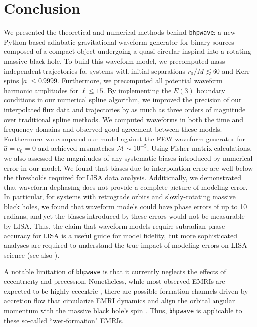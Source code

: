 \documentclass[%
 reprint,
 nofootinbib,
 amsmath,amssymb,
 aps,
 prd,
]{revtex4-2}
\begin{document}
\section{Conclusion}
\label{sec:conclusion}

We presented the theoretical and numerical methods behind \texttt{bhpwave}: a new Python-based adiabatic gravitational waveform generator for binary sources composed of a compact object undergoing a quasi-circular inspiral into a rotating massive black hole. To build this waveform model, we precomputed mass-independent trajectories for systems with initial separations $r_0/M \lesssim 60$ and Kerr spins $|a| \leq 0.9999$. Furthermore, we precomputed all potential waveform harmonic amplitudes for $\ell \leq 15$. By implementing the $E(3)$ boundary conditions in our numerical spline algorithm, we improved the precision of our interpolated flux data and trajectories by as much as three orders of magnitude over traditional spline methods. We computed waveforms in both the time and frequency domains and observed good agreement between these models. Furthermore, we compared our model against the FEW waveform generator for $\hat{a} = e_0 = 0$ and achieved mismatches $\mathcal{M} \sim 10^{-5}$. Using Fisher matrix calculations, we also assessed the magnitudes of any systematic biases introduced by numerical error in our model. We found that biases due to interpolation error are well below the thresholds required for LISA data analysis. Additionally, we demonstrated that waveform dephasing does not provide a complete picture of modeling error. In particular, for systems with retrograde orbits and slowly-rotating massive black holes, we found that waveform models could have phase errors of up to 10 radians, and yet the biases introduced by these errors would not be measurable by LISA. Thus, the claim that waveform models require subradian phase accuracy for LISA is a useful guide for model fidelity, but more sophisticated analyses are required to understand the true impact of modeling errors on LISA science (see also \cite{BurkETC23}).

A notable limitation of \texttt{bhpwave} is that it currently neglects the effects of eccentricity and precession. Nonetheless, while most observed EMRIs are expected to be highly eccentric \cite{GairETC04},  there are possible formation channels driven by accretion flow that circularize EMRI dynamics and align the orbital angular momentum with the massive black hole's spin \cite{PanLyuYang21}. Thus, \texttt{bhpwave} is applicable to these so-called ``wet-formation" EMRIs. 
\end{document}
